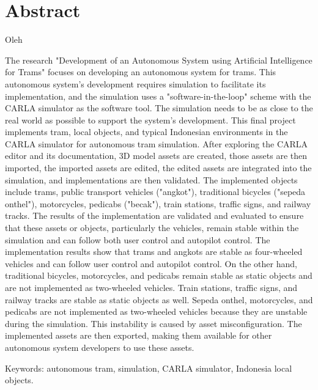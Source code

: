\chapter*{Abstract}

\begin{center}
	\center
	\begin{onehalfspace}
		\Large \bfseries \MakeUppercase{\thetitleinenglish}

		\normalfont \normalsize
		Oleh

		\theauthor
	\end{onehalfspace}
\end{center}

\begin{singlespace}
	The research "Development of an Autonomous System using Artificial
	Intelligence for Trams" focuses on developing an autonomous system for
	trams. This autonomous system's development requires simulation to
	facilitate its implementation, and the simulation uses a
	"software-in-the-loop" scheme with the CARLA simulator as the software tool.
	The simulation needs to be as close to the real world as possible to support
	the system's development. This final project implements tram, local objects,
	and typical Indonesian environments in the CARLA simulator for autonomous
	tram simulation. After exploring the CARLA editor and its documentation, 3D
	model assets are created, those assets are then imported, the imported
	assets are edited, the edited assets are integrated into the simulation, and
	implementations are then validated. The implemented objects include trams,
	public transport vehicles ("angkot"), traditional bicycles ("sepeda
	onthel"), motorcycles, pedicabs ("becak"), train stations, traffic signs,
	and railway tracks. The results of the implementation are validated and
	evaluated to ensure that these assets or objects, particularly the vehicles,
	remain stable within the simulation and can follow both user control and
	autopilot control. The implementation results show that trams and angkots
	are stable as four-wheeled vehicles and can follow user control and
	autopilot control. On the other hand, traditional bicycles, motorcycles, and
	pedicabs remain stable as static objects and are not implemented as
	two-wheeled vehicles. Train stations, traffic signs, and railway tracks are
	stable as static objects as well. Sepeda onthel, motorcycles, and pedicabs
	are not implemented as two-wheeled vehicles because they are unstable during
	the simulation. This instability is caused by asset misconfiguration. The
	implemented assets are then exported, making them available for other
	autonomous system developers to use these assets.

	Keywords: autonomous tram, simulation, CARLA simulator, Indonesia local
	objects.
\end{singlespace}

\clearpage
